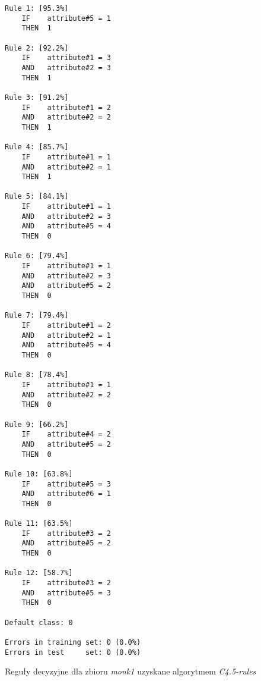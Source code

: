 \begin{figure}
\begin{verbatim}
Rule 1: [95.3%]
    IF    attribute#5 = 1
    THEN  1

Rule 2: [92.2%]
    IF    attribute#1 = 3
    AND   attribute#2 = 3
    THEN  1

Rule 3: [91.2%]
    IF    attribute#1 = 2
    AND   attribute#2 = 2
    THEN  1

Rule 4: [85.7%]
    IF    attribute#1 = 1
    AND   attribute#2 = 1
    THEN  1

Rule 5: [84.1%]
    IF    attribute#1 = 1
    AND   attribute#2 = 3
    AND   attribute#5 = 4
    THEN  0

Rule 6: [79.4%]
    IF    attribute#1 = 1
    AND   attribute#2 = 3
    AND   attribute#5 = 2
    THEN  0

Rule 7: [79.4%]
    IF    attribute#1 = 2
    AND   attribute#2 = 1
    AND   attribute#5 = 4
    THEN  0

Rule 8: [78.4%]
    IF    attribute#1 = 1
    AND   attribute#2 = 2
    THEN  0

Rule 9: [66.2%]
    IF    attribute#4 = 2
    AND   attribute#5 = 2
    THEN  0

Rule 10: [63.8%]
    IF    attribute#5 = 3
    AND   attribute#6 = 1
    THEN  0

Rule 11: [63.5%]
    IF    attribute#3 = 2
    AND   attribute#5 = 2
    THEN  0

Rule 12: [58.7%]
    IF    attribute#3 = 2
    AND   attribute#5 = 3
    THEN  0

Default class: 0

Errors in training set: 0 (0.0%)
Errors in test     set: 0 (0.0%)
\end{verbatim}
\caption{Reguły decyzyjne dla zbioru \emph{monk1} uzyskane algorytmem \emph{C4.5-rules}}
\label{p2t2-vote-rules}
\end{figure}
